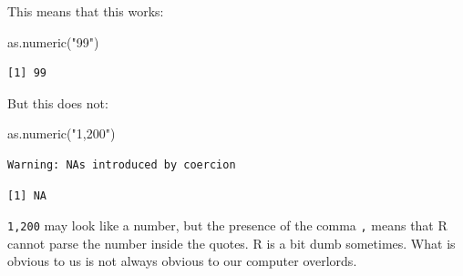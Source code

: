 \documentclass[
  letterpaper,
  DIV=11,
  numbers=noendperiod]{scrreprt}
\newenvironment{Shaded}{\begin{snugshade}}{\end{snugshade}}
\newcommand{\FunctionTok}[1]{\textcolor[rgb]{0.28,0.35,0.67}{#1}}
\newcommand{\NormalTok}[1]{\textcolor[rgb]{0.00,0.23,0.31}{#1}}
\newcommand{\StringTok}[1]{\textcolor[rgb]{0.13,0.47,0.30}{#1}}
\begin{document}
This means that this works:

\begin{Shaded}
\begin{Highlighting}[]
\FunctionTok{as.numeric}\NormalTok{(}\StringTok{"99"}\NormalTok{)}
\end{Highlighting}
\end{Shaded}

\begin{verbatim}
[1] 99
\end{verbatim}

But this does not:

\begin{Shaded}
\begin{Highlighting}[]
\FunctionTok{as.numeric}\NormalTok{(}\StringTok{"1,200"}\NormalTok{)}
\end{Highlighting}
\end{Shaded}

\begin{verbatim}
Warning: NAs introduced by coercion
\end{verbatim}

\begin{verbatim}
[1] NA
\end{verbatim}

\texttt{1,200} may look like a number, but the presence of the comma
\texttt{,} means that R cannot parse the number inside the quotes. R is
a bit dumb sometimes. What is obvious to us is not always obvious to our
computer overlords.
\end{document}
